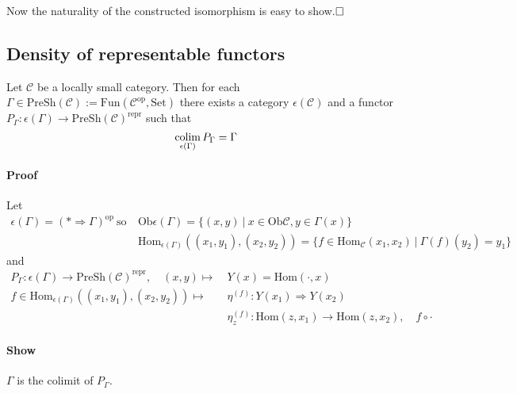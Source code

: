 Now the naturality of the constructed isomorphism is easy to show.$\hfill\square$

\subsection{Density of representable functors}
Let $\mathcal{C}$ be a locally small category. 
Then for each $\Gamma \in \mathrm{PreSh}(\mathcal{C}) := \mathrm{Fun}(\mathcal{C}^{\mathrm{op}}, \mathrm{Set})$ there exists a category $\epsilon(\mathcal{C})$ and a functor $P_\Gamma: \epsilon(\Gamma) \to \mathrm{PreSh}(\mathcal{C})^{\mathrm{repr}}$ such that
\begin{equation*}
    \operatorname*{colim}_{\epsilon(\Gamma)} P_\Gamma = \Gamma
\end{equation*}
\paragraph{Proof} Let
\begin{align*}
    \epsilon(\Gamma) = (* \Rightarrow \Gamma)^{\mathrm{op}} \ \text{so} \ &\mathrm{Ob}\epsilon(\Gamma) = \{ (x, y) \ | \ x \in \mathrm{Ob}\mathcal{C}, y \in \Gamma(x)\} \\
    &\mathrm{Hom}_{\epsilon(\Gamma)}((x_1, y_1), (x_2, y_2)) = \{ f \in \mathrm{Hom}_{\mathcal{C}}(x_1, x_2) \ | \ \Gamma(f)(y_2) = y_1 \}
\end{align*}
and
\begin{align*}
    P_\Gamma: \epsilon(\Gamma) \to \mathrm{PreSh}(\mathcal{C})^{\mathrm{repr}}, \quad (x, y) \mapsto \ &Y(x) = \mathrm{Hom}(\cdot, x) \\
    f \in \mathrm{Hom}_{\epsilon(\Gamma)}((x_1, y_1), (x_2, y_2)) \mapsto \ &\eta^{(f)}: Y(x_1) \Rightarrow Y(x_2) \\
    &\eta^{(f)}_z: \mathrm{Hom}(z, x_1) \to \mathrm{Hom}(z, x_2), \quad f \circ \cdot
\end{align*}
\paragraph{Show} $\Gamma$ is the colimit of $P_\Gamma$.


